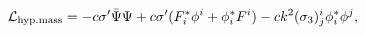 \begin{equation}
  {\cal L}_{\rm hyp.mass} 
  = - c \sigma' \bar{\Psi} \Psi 
    + c \sigma' (F^*_i\phi^i + \phi^*_iF^i)
    - ck^2 (\sigma_3)^i_j \phi^*_i \phi^j,
\label{eq:hypermass}
\end{equation}

